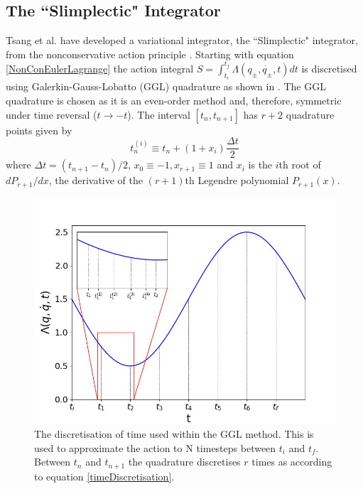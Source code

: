 \documentclass[10pt]{iopart}
\begin{document}
\subsection{The ``Slimplectic" Integrator \\}
Tsang et al. \cite{Tsang_Slimplectic} have developed a variational integrator, the ``Slimplectic" integrator, from the nonconservative action principle \cite{GalleyEtAl}. Starting with equation \ref{NonConEulerLagrange} the action integral $S = \int_{t_i}^{t_f}\Lambda(q_{\pm},\dot{q_{\pm}},t)dt$ is discretised using Galerkin-Gauss-Lobatto (GGL) quadrature \cite{GGL} as shown in . The GGL quadrature is chosen as it is an even-order method and, therefore, symmetric under time reversal ($t\to-t$). The interval $[t_n, t_{n+1}]$ has $r+2$ quadrature points given by
\begin{equation}
\label{timeDiscretisation}
	t_n^{(i)} \equiv t_n + (1+x_i)\frac{\Delta t}{2}
\end{equation}
where $\Delta t = (t_{n+1}-t_n)/2$, $x_0 \equiv -1, x_{r+1} \equiv 1$ and $x_i$ is the $i$th root of $dP_{r+1}/dx$, the derivative of the $(r+1)$th Legendre polynomial $P_{r+1}(x)$. 
\begin{figure}
	\centering
	\includegraphics[width =\columnwidth]{cartoon.jpg}
	\caption{The discretisation of time used within the GGL method. This is used to approximate the action to N timesteps between $t_i$ and $t_f$. Between $t_n$ and $t_{n+1}$ the quadrature discretises $r$ times as according to equation \ref{timeDiscretisation}.}
		\label{GGLDiscretisation}
\end{figure}
\end{document}
